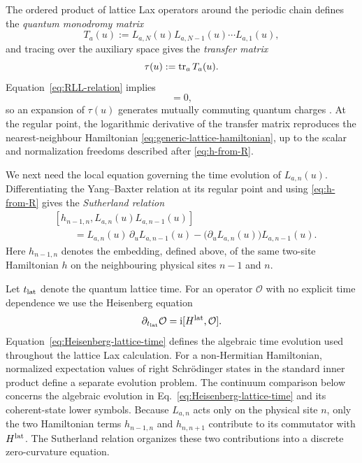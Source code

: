 The ordered product of lattice Lax operators around the periodic chain defines
the \emph{quantum monodromy matrix}
\begin{equation}
T_a(u)
:=L_{a,N}(u)L_{a,N-1}(u)\cdots L_{a,1}(u),
\label{eq:quantum-monodromy}
\end{equation}
and tracing over the auxiliary space gives the \emph{transfer matrix}
\begin{equation}
\tau(u):=\operatorname{tr}_a T_a(u).
\label{eq:quantum-transfer-matrix}
\end{equation}
Equation~\eqref{eq:RLL-relation} implies
\begin{equation}
[\tau(u),\tau(v)]=0,
\label{eq:commuting-transfer-matrices}
\end{equation}
so an expansion of $\tau(u)$ generates mutually commuting quantum charges
\cite{Faddeev1996}.
At the regular point, the logarithmic derivative of the transfer matrix
reproduces the nearest-neighbour Hamiltonian
\eqref{eq:generic-lattice-hamiltonian}, up to the scalar and normalization
freedoms described after \eqref{eq:h-from-R}.

We next need the local equation governing the time evolution of
$L_{a,n}(u)$.  Differentiating the Yang--Baxter relation at its regular point
and using \eqref{eq:h-from-R} gives the \emph{Sutherland relation}
\cite{deLeeuwPribytokRyan2019}
\begin{align}
&[h_{n-1,n},L_{a,n}(u)L_{a,n-1}(u)]
\nonumber\\
&\qquad=
L_{a,n}(u)\,\partial_u L_{a,n-1}(u)
-
\bigl(\partial_uL_{a,n}(u)\bigr)L_{a,n-1}(u).
\label{eq:Sutherland-relation}
\end{align}
Here $h_{n-1,n}$ denotes the embedding, defined above, of the same two-site
Hamiltonian $h$ on the neighbouring physical sites $n-1$ and $n$.

Let $t_{\rm lat}$ denote the quantum lattice time.  For an operator
$\mathcal O$ with no explicit time dependence we use the Heisenberg equation
\begin{equation}
\partial_{t_{\rm lat}}\mathcal O
=\mathrm{i}[H^{\rm lat},\mathcal O].
\label{eq:Heisenberg-lattice-time}
\end{equation}
Equation~\eqref{eq:Heisenberg-lattice-time} defines the algebraic time
evolution used throughout the lattice Lax calculation.  For a non-Hermitian
Hamiltonian, normalized expectation values of right Schr\"odinger states in
the standard inner product define a separate evolution problem.  The
continuum comparison below concerns the algebraic evolution in
Eq.~\eqref{eq:Heisenberg-lattice-time} and its coherent-state lower symbols.
Because $L_{a,n}$ acts only on the physical site $n$, only the two Hamiltonian
terms $h_{n-1,n}$ and $h_{n,n+1}$ contribute to its commutator with
$H^{\rm lat}$.  The Sutherland relation organizes these two contributions
into a discrete zero-curvature equation.

